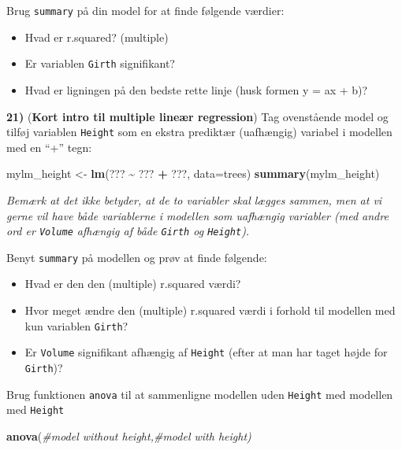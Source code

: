 \documentclass[
]{book}
\newenvironment{Shaded}{\begin{snugshade}}{\end{snugshade}}
\newcommand{\AttributeTok}[1]{\textcolor[rgb]{0.13,0.29,0.53}{#1}}
\newcommand{\CommentTok}[1]{\textcolor[rgb]{0.56,0.35,0.01}{\textit{#1}}}
\newcommand{\FunctionTok}[1]{\textcolor[rgb]{0.13,0.29,0.53}{\textbf{#1}}}
\newcommand{\NormalTok}[1]{#1}
\newcommand{\OtherTok}[1]{\textcolor[rgb]{0.56,0.35,0.01}{#1}}
\newcommand{\SpecialCharTok}[1]{\textcolor[rgb]{0.81,0.36,0.00}{\textbf{#1}}}
\providecommand{\tightlist}{%
  \setlength{\itemsep}{0pt}\setlength{\parskip}{0pt}}
\begin{document}
Brug \texttt{summary} på din model for at finde følgende værdier:

\begin{itemize}
\tightlist
\item
  Hvad er r.squared? (multiple)
\item
  Er variablen \texttt{Girth} signifikant?
\item
  Hvad er ligningen på den bedste rette linje (husk formen y = ax + b)?
\end{itemize}

\textbf{21)} (\textbf{Kort intro til multiple lineær regression}) Tag ovenstående model og tilføj variablen \texttt{Height} som en ekstra prediktær (uafhængig) variabel i modellen med en ``+'' tegn:

\begin{Shaded}
\begin{Highlighting}[]
\NormalTok{mylm\_height }\OtherTok{\textless{}{-}} \FunctionTok{lm}\NormalTok{(??? }\SpecialCharTok{\textasciitilde{}}\NormalTok{ ??? }\SpecialCharTok{+}\NormalTok{ ???, }\AttributeTok{data=}\NormalTok{trees) }
\FunctionTok{summary}\NormalTok{(mylm\_height)}
\end{Highlighting}
\end{Shaded}

\emph{Bemærk at det ikke betyder, at de to variabler skal lægges sammen, men at vi gerne vil have både variablerne i modellen som uafhængig variabler (med andre ord er \texttt{Volume} afhængig af både \texttt{Girth} og \texttt{Height}).}

Benyt \texttt{summary} på modellen og prøv at finde følgende:

\begin{itemize}
\tightlist
\item
  Hvad er den den (multiple) r.squared værdi?
\item
  Hvor meget ændre den (multiple) r.squared værdi i forhold til modellen med kun variablen \texttt{Girth}?
\item
  Er \texttt{Volume} signifikant afhængig af \texttt{Height} (efter at man har taget højde for \texttt{Girth})?
\end{itemize}

Brug funktionen \texttt{anova} til at sammenligne modellen uden \texttt{Height} med modellen med \texttt{Height}

\begin{Shaded}
\begin{Highlighting}[]
\FunctionTok{anova}\NormalTok{(}\CommentTok{\#model without height,\#model with height)}
\end{Highlighting}
\end{Shaded}
\end{document}
